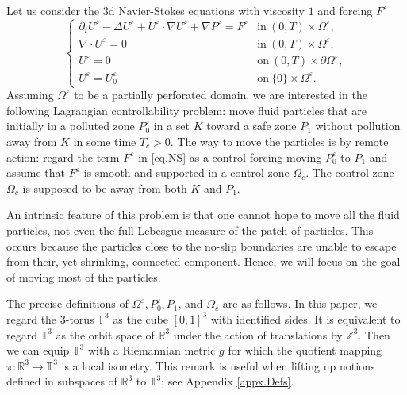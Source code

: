 \documentclass[11pt,a4paper]{article}
\numberwithin{equation}{section}
\newcommand{\Z}{\mathbb{Z}}
\newcommand{\R}{\mathbb{R}}
\newcommand{\T}{\mathbb{T}}
\newcommand{\eps}{\varepsilon}
\begin{document}
Let us consider the 3d Navier-Stokes equations with viscosity $1$ and forcing $F^\eps$
\begin{equation}\label{eq.NS}
    \left\{
    \begin{array}{ll}
    \partial_t U^\eps - \Delta U^\eps + U^\eps\cdot\nabla U^\eps + \nabla P^\eps 
    = F^\eps &\mbox{in}\ (0,T)\times\Omega^\eps,\\
    \nabla\cdot U^\eps = 0 &\mbox{in}\ (0,T)\times\Omega^\eps,\\
    U^\eps = 0 &\mbox{on}\ (0,T)\times\partial\Omega^\eps,\\
    U^\eps = U^\eps_0 &\mbox{on}\ \{0\}\times\Omega^\eps.
    \end{array}\right.
\end{equation}
Assuming $\Omega^\eps$ to be a partially perforated domain, we are interested in the following Lagrangian controllability problem: move fluid particles that are initially in a polluted zone $P_0^\eps$ in a set $K$ toward a safe zone $P_1$ without pollution away from $K$ in some time $T_c>0$. The way to move the particles is by remote action: regard the term $F^\eps$ in \eqref{eq.NS} as a control forcing moving $P_0^\eps$ to $P_1$ and assume that $F^\eps$ is smooth and supported in a control zone $\Omega_c$. The control zone $\Omega_c$ is supposed to be away from both $K$ and $P_1$. 


An intrinsic feature of this problem is that one cannot hope to move all the fluid particles, not even the full Lebesgue measure of the patch of particles. This occurs because the particles close to the no-slip boundaries are unable to escape from their, yet shrinking, connected component. Hence, we will focus on the goal of moving most of the particles. 


The precise definitions of $\Omega^\eps, P_0^\eps, P_1$, and $\Omega_c$ are as follows. In this paper, we regard the $3$-torus $\T^3$ as the cube $[0,1]^3$ with identified sides. It is equivalent to regard $\T^3$ as the orbit space of $\R^3$ under the action of translations by $\Z^3$. Then we can equip $\T^3$ with a Riemannian metric $g$ for which the quotient mapping $\pi: \R^3 \to \T^3$ is a local isometry. This remark is useful when lifting up notions defined in subspaces of $\R^3$ to $\T^3$; see Appendix \ref{appx.Defs}. 
\end{document}
